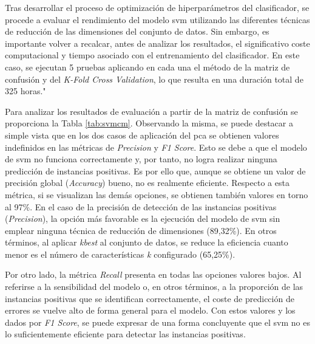 Tras desarrollar el proceso de optimización de hiperparámetros del clasificador, se procede a evaluar el rendimiento del modelo \gls{svm} utilizando las diferentes técnicas de reducción de las dimensiones del conjunto de datos. Sin embargo, es importante volver a recalcar, antes de analizar los resultados, el significativo coste computacional y tiempo asociado con el entrenamiento del clasificador. En este caso, se ejecutan 5 pruebas aplicando en cada una el método de la matriz de confusión y del \textit{K-Fold Cross Validation}, lo que resulta en una duración total de 325 horas."

\vspace{3mm}

Para analizar los resultados de evaluación a partir de la matriz de confusión se proporciona la Tabla \ref{tab:svmcm}. Observando la misma, se puede destacar a simple vista que en los dos casos de aplicación del \gls{pca} se obtienen valores indefinidos en las métricas de \textit{Precision} y \textit{F1 Score}. Esto se debe a que el modelo de \gls{svm} no funciona correctamente y, por tanto, no logra realizar ninguna predicción de instancias positivas. Es por ello que, aunque se obtiene un valor de precisión global (\textit{Accuracy}) bueno, no es realmente eficiente. Respecto a esta métrica, si se visualizan las demás opciones, se obtienen también valores en torno al 97\%. En el caso de la precisión de detección de las instancias positivas (\textit{Precision}), la opción más favorable es la ejecución del modelo de \gls{svm} sin emplear ninguna técnica de reducción de dimensiones (89,32\%). En otros términos, al aplicar \textit{kbest} al conjunto de datos, se reduce la eficiencia cuanto menor es el número de características \textit{k} configurado (65,25\%).

\vspace{3mm}

Por otro lado, la métrica \textit{Recall} presenta en todas las opciones valores  bajos. Al referirse a la sensibilidad del modelo o, en otros términos, a la proporción de las instancias positivas que se identifican correctamente, el coste de predicción de errores se vuelve alto de forma general para el modelo. Con estos valores y los dados por \textit{F1 Score}, se puede expresar de una forma concluyente que el \gls{svm} no es lo suficientemente eficiente para detectar las instancias positivas. 

\vspace{3mm}

